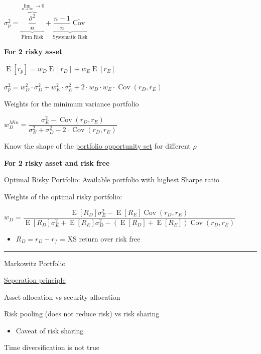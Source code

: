 \documentclass[]{book}
\providecommand{\tightlist}{%
  \setlength{\itemsep}{0pt}\setlength{\parskip}{0pt}}
\theoremstyle{definition}
\theoremstyle{definition}
\theoremstyle{remark}
\begin{document}
\(\sigma^2_p = \underbrace{\overbrace{\dfrac{\bar{\sigma}^2}{n}}^{\lim \limits_{n \rightarrow \infty} \rightarrow 0}}_{\text{Firm Risk}} + \underbrace{\dfrac{n-1}{n}\bar{\operatorname{Cov}}}_{\text{Systematic Risk}}\)

\textbf{For 2 risky asset}

\(\operatorname{E}[r_p] = w_D \operatorname{E}[r_D] + w_E \operatorname{E}[r_E]\)

\(\sigma^2_p = w^2_D \cdot \sigma^2_D + w^2_E \cdot \sigma^2_E + 2 \cdot w_D \cdot w_E \cdot \operatorname{Cov}(r_D, r_E)\)

Weights for the minimum variance portfolio

\(w_D^{Min} = \dfrac{\sigma^2_E - \operatorname{Cov}(r_D, r_E)}{\sigma^2_E + \sigma^2_D - 2\cdot\operatorname{Cov}(r_D, r_E)}\)

Know the shape of the \protect\hyperlink{ptf-op-set}{portfolio
opportunity set} for different \(\rho\)

\textbf{For 2 risky asset and risk free}

Optimal Risky Portfolio: Available portfolio with highest Sharpe ratio

Weights of the optimal risky portfolio:

\(w_D = \dfrac{\operatorname{E}[R_D]\sigma^2_E - \operatorname{E}[R_E] \operatorname{Cov}(r_D, r_E)}{\operatorname{E}[R_D]\sigma^2_E + \operatorname{E}[R_E]\sigma^2_D - \left( \operatorname{E}[R_D] + \operatorname{E}[R_E] \right) \operatorname{Cov}(r_D, r_E)}\)

\begin{itemize}
\tightlist
\item
  \(R_D = r_D - r_f\) = XS return over risk free
\end{itemize}

\begin{center}\rule{0.5\linewidth}{\linethickness}\end{center}

Markowitz Portfolio

\protect\hyperlink{sep-prin}{Seperation principle}

Asset allocation vs security allocation

Risk pooling (does not reduce risk) vs risk sharing

\begin{itemize}
\tightlist
\item
  Caveat of risk sharing
\end{itemize}

Time diversification is not true
\end{document}
